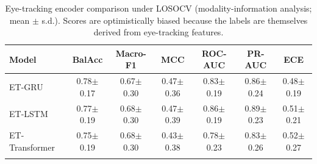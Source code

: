 \begin{table}[t]
  \caption{Eye-tracking encoder comparison under LOSOCV (modality-information analysis; mean $\pm$ s.d.). Scores are optimistically biased because the labels are themselves derived from eye-tracking features.}
  \label{tab:et_baselines}
  \centering
  \small
  \begin{tabular}{@{}lcccccc@{}}
    \toprule
    Model & BalAcc & Macro-F1 & MCC & ROC-AUC & PR-AUC & ECE \\
    \midrule
    ET-GRU         & 0.78$\pm$0.17 & 0.67$\pm$0.30 & 0.47$\pm$0.36 & 0.83$\pm$0.19 & 0.86$\pm$0.24 & 0.48$\pm$0.19 \\
    ET-LSTM        & 0.77$\pm$0.19 & 0.68$\pm$0.30 & 0.47$\pm$0.39 & 0.86$\pm$0.19 & 0.89$\pm$0.23 & 0.51$\pm$0.21 \\
    ET-Transformer & 0.75$\pm$0.19 & 0.68$\pm$0.30 & 0.43$\pm$0.38 & 0.78$\pm$0.23 & 0.83$\pm$0.26 & 0.52$\pm$0.27 \\
    \botrule
  \end{tabular}
\end{table}
